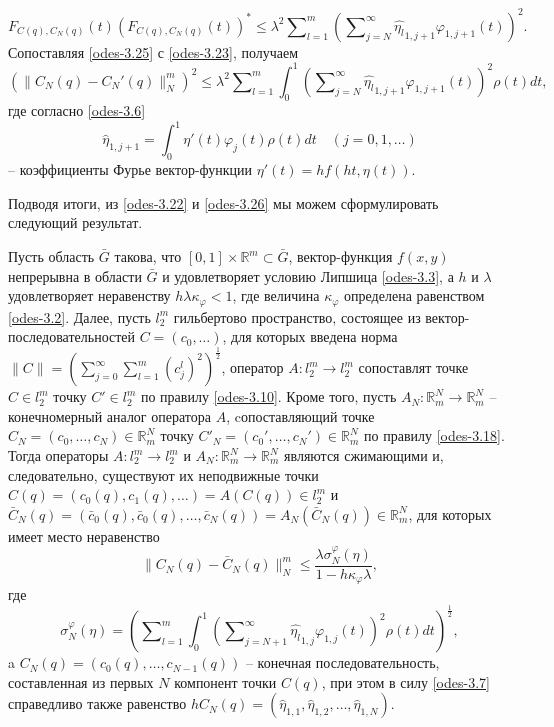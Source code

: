 \begin{equation}\label{odes-3.25}
F_{C(q),C_N(q)}(t)(F_{C(q),C_N(q)}(t))^*\le \lambda^2   \sum\nolimits_{l=1}^m \left(\sum\nolimits_{j=N}^\infty  \widehat {\eta_l}_{1,j+1}\varphi_{1,j+1}(t)\right)^2.
\end{equation}
Сопоставляя \eqref{odes-3.25} с \eqref{odes-3.23}, получаем
\begin{equation}\label{odes-3.26}
(\|C_N(q)- C_N'(q)\|_N^m)^2\le \lambda^2\sum\nolimits_{l=1}^m\int_{0}^1\left(\sum\nolimits_{j=N}^\infty \widehat {\eta_l}_{1,j+1}\varphi_{1,j+1}(t)\right)^2\rho(t) dt,
\end{equation}
где согласно \eqref{odes-3.6}
\begin{equation}\label{odes-3.27}
 \hat \eta_{1,j+1}=\int_{0}^1\eta'(t)\varphi_j(t)\rho(t)dt \quad(j=0,1,\ldots)
\end{equation}
-- коэффициенты Фурье вектор-функции $\eta'(t)=hf(ht,\eta(t))$.

Подводя итоги, из \eqref{odes-3.22} и \eqref{odes-3.26}  мы можем сформулировать следующий результат.
\begin{theorem}
Пусть область $\bar G$ такова, что $[0,1]\times\mathbb{R}^m\subset \bar G$, вектор-функция $f(x,y)$ непрерывна в области $\bar G$ и удовлетворяет условию Липшица \eqref{odes-3.3}, а $h$ и $\lambda$ удовлетворяет неравенству $h\lambda\kappa_\varphi<1$, где величина $\kappa_\varphi$ определена равенством \eqref{odes-3.2}. Далее, пусть $l_2^m$ гильбертово пространство, состоящее из вектор-последовательностей $C=(c_0,\ldots)$, для которых введена норма $\|C\|=\left(\sum\nolimits_{j=0}^{\infty} \sum\nolimits_{l=1}^{m}(c_j^l)^2\right)^\frac12$,   оператор $A: l_2^m\to l_2^m$ сопоставлят точке $C\in l_2^m$ точку $C'\in l_2^m$ по правилу \eqref{odes-3.10}. Кроме того, пусть $A_N:\mathbb{R}^N_m\to \mathbb{R}^N_m$ -- конечномерный аналог оператора $A$, cопоставляющий точке $C_N=(c_0,\ldots,c_{N})\in \mathbb{R}^N_m $ точку  $C'_N=(c_0',\ldots,c_{N}')\in \mathbb{R}^N_m $ по правилу \eqref{odes-3.18}.
Тогда операторы $A: l_2^m\to l_2^m$ и $A_N:\mathbb{R}^N_m\to \mathbb{R}^N_m$ являются сжимающими и, следовательно, существуют  их неподвижные точки $C(q)=(c_0(q),c_1(q),\ldots)=A(C(q))\in l_2^m$ и $\bar C_N(q)=(\bar c_0(q),\bar c_0(q),\ldots,\bar c_{N}(q))=A_N(\bar C_N(q))\in \mathbb{R}^N_m$, для которых имеет место неравенство
\begin{equation}\label{odes-3.28}
\|C_N(q)-\bar C_N(q)\|_N^m\le \frac{\lambda \sigma_N^\varphi(\eta)}{1-h\kappa_\varphi\lambda},
\end{equation}
где
\begin{equation}\label{odes-3.29}
\sigma_N^\varphi(\eta)=\left(\sum\nolimits_{l=1}^m\int_{0}^1\left(\sum\nolimits_{j=N+1}^\infty \widehat {\eta_l}_{1,j}\varphi_{1,j}(t)\right)^2\rho(t) dt\right)^\frac12,
\end{equation}
 a $C_N(q)=(c_0(q),\ldots,c_{N-1}(q))$ -- конечная последовательность, составленная из первых $N$ компонент точки  $C(q)$, при этом в силу  \eqref{odes-3.7} справедливо также равенство  $hC_N(q)=(\hat \eta_{1,1},\hat \eta_{1,2}, \ldots, \hat \eta_{1,N})$.
\end{theorem}


